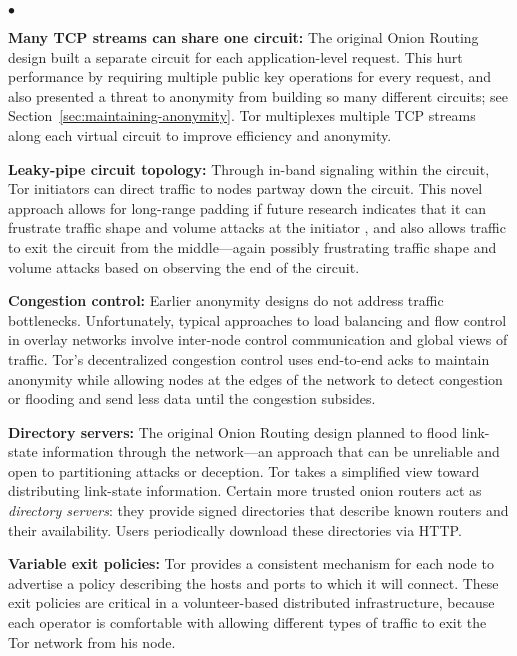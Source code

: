 \documentclass[times,10pt,twocolumn]{article}
\newenvironment{tightlist}{\begin{list}{$\bullet$}{
  \setlength{\itemsep}{0mm}
    \setlength{\parsep}{0mm}
    }}{\end{list}}
\begin{document}
\begin{tightlist}
\item \textbf{Many TCP streams can share one circuit:} The
original Onion Routing design built a separate circuit for each
application-level request.  This hurt performance by requiring
multiple public key operations for every request, and also presented
a threat to anonymity from building so many different circuits; see
Section~\ref{sec:maintaining-anonymity}.  Tor multiplexes multiple TCP
streams along each virtual circuit to improve efficiency and anonymity.

\item \textbf{Leaky-pipe circuit topology:} Through in-band signaling
within the circuit, Tor initiators can direct traffic to nodes partway
down the circuit. This novel approach allows for long-range padding if
future research indicates that it can frustrate traffic shape and volume
attacks at the initiator \cite{defensive-dropping}, and
also allows traffic to exit the circuit from the middle---again possibly
frustrating traffic shape and volume attacks based on observing the end
of the circuit.

\item \textbf{Congestion control:} Earlier anonymity designs do not
address traffic bottlenecks. Unfortunately, typical approaches to
load balancing and flow control in overlay networks involve inter-node
control communication and global views of traffic. Tor's decentralized
congestion control uses end-to-end acks to maintain anonymity
while allowing nodes at the edges of the network to detect congestion
or flooding and send less data until the congestion subsides.

\item \textbf{Directory servers:} The original Onion Routing design
planned to flood link-state information through the network---an approach
that can be unreliable and open to partitioning attacks or
deception. Tor takes a simplified view toward distributing link-state
information. Certain more trusted onion routers act as \emph{directory
servers}: they provide signed directories that describe known
routers and their availability.  Users periodically download these
directories via HTTP.

\item \textbf{Variable exit policies:} Tor provides a consistent mechanism
for each node to advertise a policy describing the hosts
and ports to which it will connect. These exit policies are critical
in a volunteer-based distributed infrastructure, because each operator
is comfortable with allowing different types of traffic to exit the Tor
network from his node.


\end{tightlist}
\end{document}
